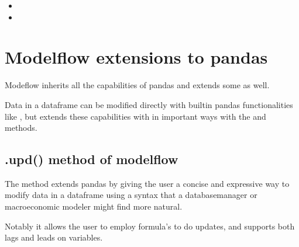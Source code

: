 \documentclass[letterpaper,10pt,english]{jupyterBook}
\begin{document}
\sphinxAtStartPar
{}
\begin{itemize}
\item {} 
\sphinxAtStartPar
{}

\item {} 
\sphinxAtStartPar
{}

\end{itemize}

\sphinxstepscope


\chapter{Modelflow extensions to pandas}
\label{\detokenize{content/04_PythonEssentials/UpdateCommand:modelflow-extensions-to-pandas}}\label{\detokenize{content/04_PythonEssentials/UpdateCommand::doc}}
\sphinxAtStartPar
Modeflow inherits all the capabilities of pandas and extends some as well.

\sphinxAtStartPar
Data in a dataframe can be modified directly with built\sphinxhyphen{}in pandas functionalities like , but  extends these capabilities with in important ways with the  and  methods.


\section{.upd() method of modelflow}
\label{\detokenize{content/04_PythonEssentials/UpdateCommand:upd-method-of-modelflow}}
\sphinxAtStartPar
The  method extends pandas by giving the user a concise and expressive way to modify data in a dataframe using a syntax that a database\sphinxhyphen{}manager or macroeconomic modeler might find more natural.

\sphinxAtStartPar
Notably it allows the user to employ formula’s to do updates, and supports both lags and leads on variables.
\end{document}

